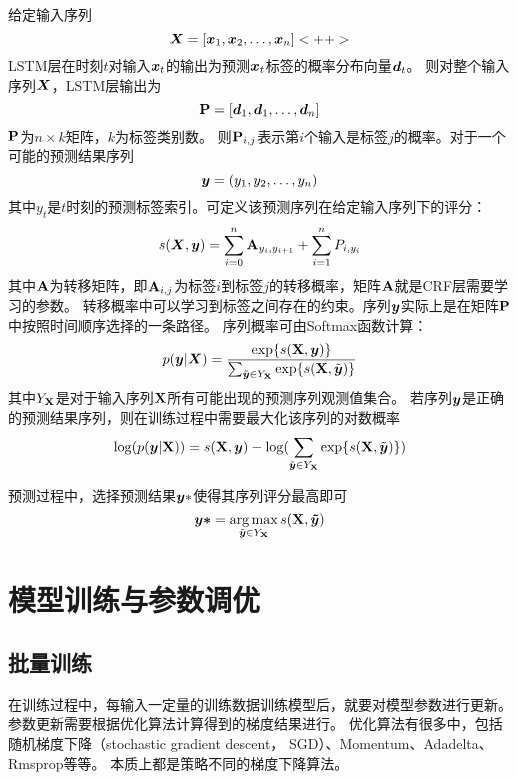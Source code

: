 给定输入序列
\begin{equation}
    \boldsymbol{X} = [\boldsymbol{x}_1, \boldsymbol{x}_2,\dots, \boldsymbol{x}_n]<++>
\end{equation}
LSTM层在时刻$t$对输入$\boldsymbol{x}_t$的输出为预测$\boldsymbol{x}_t$标签的概率分布向量$\boldsymbol{d}_t$。
则对整个输入序列$\boldsymbol{X}$，LSTM层输出为
\begin{equation}
    \boldsymbol{\mathbf{P}} = [\boldsymbol{d}_1,\boldsymbol{d}_1,\dots,\boldsymbol{d}_n]
\end{equation}
$\boldsymbol{\mathbf{P}}$为$n\times k$矩阵，$k$为标签类别数。
则$\boldsymbol{\mathbf{P}}_{i, j}$表示第$i$个输入是标签$j$的概率。对于一个可能的预测结果序列
\begin{equation}
    \boldsymbol{y}=(y_1, y_2,\dots, y_n)
\end{equation}
其中$y_t$是$t$时刻的预测标签索引。可定义该预测序列在给定输入序列下的评分：
\begin{equation}
    s(\boldsymbol{X},\boldsymbol{y})=\sum^n_{i=0}\boldsymbol{\mathbf{A}}_{y_i,y_{i+1}}+\sum^n_{i=1}P_{i, y_i}
\end{equation}
其中$\boldsymbol{\mathbf{A}}$为转移矩阵，即$\boldsymbol{\mathbf{A}}_{i,j}$为标签$i$到标签$j$的转移概率，矩阵$\boldsymbol{\mathbf{A}}$就是CRF层需要学习的参数。
转移概率中可以学习到标签之间存在的约束。序列$\boldsymbol{y}$实际上是在矩阵$\boldsymbol{\mathbf{P}}$中按照时间顺序选择的一条路径。
序列概率可由Softmax函数计算：
\begin{equation}
    p(\boldsymbol{y}|\boldsymbol{X})=\frac{\exp\{s(\boldsymbol{\mathbf{X}},\boldsymbol{y})\}}{\sum_{\tilde{\boldsymbol{y}}\in Y_{\boldsymbol{\mathbf{X}}}}\exp\{s(\boldsymbol{\mathbf{X}},\tilde{\boldsymbol{y}})\}}
\end{equation}
其中$Y_{\boldsymbol{\mathbf{X}}}$是对于输入序列$\boldsymbol{\mathbf{X}}$所有可能出现的预测序列观测值集合。
若序列$\boldsymbol{y}$是正确的预测结果序列，则在训练过程中需要最大化该序列的对数概率
\begin{equation}
    \log(p(\boldsymbol{y}|\boldsymbol{\mathbf{X}})) = s(\boldsymbol{\mathbf{X}},\boldsymbol{y})-\log(\sum_{\tilde{\boldsymbol{y}}\in Y_{\boldsymbol{\mathbf{X}}}}\exp\{s(\boldsymbol{\mathbf{X}},\tilde{\boldsymbol{y}})\})
\end{equation}

预测过程中，选择预测结果$\boldsymbol{y}*$使得其序列评分最高即可
\begin{equation}
    \boldsymbol{y*}=\mathop{\arg\max}_{\tilde{\boldsymbol{y}}\in Y_{\boldsymbol{\mathbf{X}}}} s(\boldsymbol{\mathbf{X}},\boldsymbol{\tilde{y}})
\end{equation}
\section{模型训练与参数调优}
\subsection{批量训练}
在训练过程中，每输入一定量的训练数据训练模型后，就要对模型参数进行更新。
参数更新需要根据优化算法计算得到的梯度结果进行。
优化算法有很多中，包括随机梯度下降（stochastic gradient descent， SGD）、Momentum、Adadelta、Rmsprop等等。
本质上都是策略不同的梯度下降算法。

